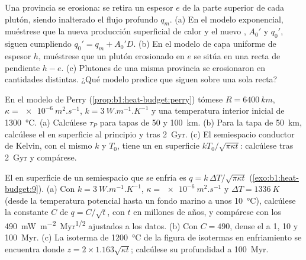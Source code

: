 \begin{exercise}[$\star\star\star$]\label{exo:b1:heat-budget:10}
Una provincia se erosiona: se retira un espesor $e$ de la parte superior de cada plutón, siendo inalterado el flujo profundo $q_m$.
(a) En el modelo exponencial, muéstrese que la nueva producción superficial de calor y el nuevo , $A_0'$ y $q_0'$,
siguen cumpliendo $q_0' = q_m + A_0'D$. (b) En el modelo de capa uniforme de espesor $h$, muéstrese que un plutón erosionado
en $e$ se sitúa en una recta de pendiente $h - e$. (c) Plutones de una misma provincia se erosionaron en cantidades distintas.
¿Qué modelo predice que siguen sobre una sola recta?
\end{exercise}

\begin{exercise}[$\star\star\star$]\label{exo:b1:heat-budget:11}
En el modelo de Perry (\cref{prop:b1:heat-budget:perry}) tómese $R = \qty{6400}{km}$,
$\kappa = \qty{e-6}{m^2.s^{-1}}$, $k = \qty{3}{W.m^{-1}.K^{-1}}$ y una temperatura interior inicial de \qty{1300}{\degreeCelsius}. (a) Calcúlese $\tau_P$ para tapas
de 50 y \qty{100}{km}. (b) Para la tapa de \qty{50}{km}, calcúlese el  en superficie al principio y tras
\qty{2}{Gyr}. (c) El semiespacio conductor de Kelvin, con el mismo $k$ y $T_0$, tiene un  en superficie
$kT_0/\sqrt{\pi\kappa t}$: calcúlese tras \qty{2}{Gyr} y compárese.
\end{exercise}

\begin{exercise}[$\star\star\star$]\label{exo:b1:heat-budget:12}
El  en superficie de un semiespacio que se enfría es $q = k\,\Delta T/\sqrt{\pi\kappa t}$
(\cref{exo:b1:heat-budget:9}). (a) Con $k = \qty{3}{W.m^{-1}.K^{-1}}$, $\kappa =
\qty{e-6}{m^2.s^{-1}}$ y $\Delta T = \qty{1336}{K}$ (desde la temperatura potencial hasta un fondo marino a unos
\qty{10}{\degreeCelsius}), calcúlese la constante $C$ de $q = C/\sqrt t$, con $t$ en millones de años, y compárese con los
\qty{490}{mW.m^{-2}.Myr^{1/2}} ajustados a los datos. (b) Con $C = 490$, dense el  a 1, 10 y \qty{100}{Myr}. (c) La
isoterma de \qty{1200}{\degreeCelsius} de la figura de isotermas en enfriamiento se encuentra donde $z = 2\times1.163\sqrt{\kappa t}$;
calcúlese su profundidad a \qty{100}{Myr}.
\end{exercise}

